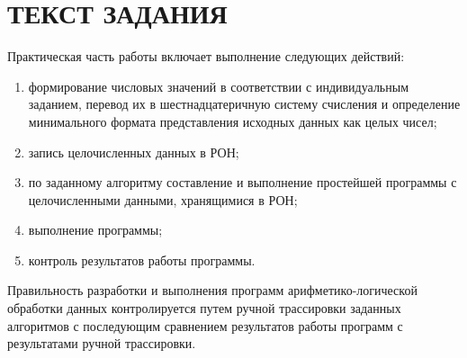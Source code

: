 \chapter{ТЕКСТ ЗАДАНИЯ}

Практическая часть работы включает выполнение следующих действий:

\begin{enumerate}

    \item формирование числовых значений в соответствии с индивидуальным заданием, 
    перевод их в шестнадцатеричную систему счисления и определение минимального
    формата представления исходных данных как целых чисел;

    \item запись целочисленных данных в РОН;
    
    \item по заданному алгоритму составление и выполнение простейшей программы с
    целочисленными данными, хранящимися в РОН;

    \item выполнение программы;
    
    \item контроль результатов работы программы.

\end{enumerate}

Правильность разработки и выполнения программ арифметико-логической обработки
данных контролируется путем ручной трассировки заданных алгоритмов с последующим
сравнением результатов работы программ с результатами ручной трассировки.